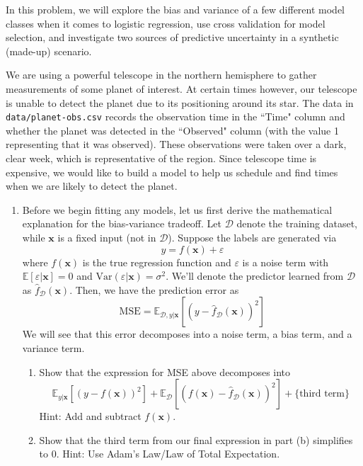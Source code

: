 \documentclass[submit]{harvardml}
\begin{document}
\begin{problem}
In this problem, we will explore the bias and variance of a few
different model classes when it comes to logistic regression, use cross validation for model selection, and
investigate two sources of predictive uncertainty in a synthetic
(made-up) scenario.

We are using a powerful telescope in the northern hemisphere to gather
measurements of some planet of interest. At certain times however, our
telescope is unable to detect the planet due to its positioning around
its star.  The data in \verb|data/planet-obs.csv| records the
observation time in the ``Time" column and whether the planet was
detected in the ``Observed" column (with the value 1 representing that
it was observed).  These observations were taken over a dark, clear
week, which is representative of the region.  Since telescope time is
expensive, we would like to build a model to help us schedule and find
times when we are likely to detect the planet.

\begin{enumerate}
\item Before we begin fitting any models, let us first derive the mathematical explanation for the bias-variance tradeoff. Let $\mathcal{D}$ denote the training dataset, while $\mathbf{x}$ is a fixed input (not in $\mathcal{D}$). Suppose the labels are generated via $$y = f(\mathbf{x}) + \varepsilon$$ where $f(\mathbf{x})$ is the true regression function and $\varepsilon$ is a noise term with $\mathbb{E}[\varepsilon|\mathbf{x}] = 0$ and $\text{Var}(\varepsilon|\mathbf{x}) = \sigma^2$. We'll denote the predictor learned from $\mathcal{D}$ as $\hat f_\mathcal{D}(\mathbf{x})$. Then, we have the prediction error as $$\text{MSE} = \mathbb{E}_{\mathcal{D}, y|\mathbf{x}}[(y - \hat f_\mathcal{D}(\mathbf{x}))^2]$$ We will see that this error decomposes into a noise term, a bias term, and a variance term. \begin{enumerate}
    \item Show that the expression for MSE above decomposes into $$\mathbb{E}_{y|\mathbf{x}}[(y - f(\mathbf{x}))^2] + \mathbb{E}_\mathcal{D}[(f(\mathbf{x}) - \hat f_\mathcal{D}(\mathbf{x}))^2] + \text{\{third term\}}$$ Hint: Add and subtract $f(\mathbf{x})$.

    \item Show that the third term from our final expression in part (b) simplifies to 0. Hint: Use Adam's Law/Law of Total Expectation.


\end{enumerate}
\end{enumerate}
\end{problem}
\end{document}
